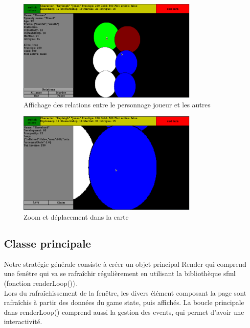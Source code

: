 \documentclass[a4paper,12pt]{article}
\begin{document}
\begin{figure}[htbp]
\includegraphics[width=0.8\textwidth]{renderRelations.png}
\caption{Affichage des relations entre le personnage joueur et les autres} 
\end{figure}

\begin{figure}[htbp]
\includegraphics[width=0.8\textwidth]{renderZoom.png}
\caption{Zoom et déplacement dans la carte} 
\end{figure}

\newpage
\subsection{Classe principale}
Notre stratégie générale consiste à créer un objet principal Render qui comprend une fenêtre qui va se rafraîchir régulièrement en utilisant la bibliothèque sfml (fonction renderLoop()).\\
Lors du rafraîchissement de la fenêtre, les divers élément composant la page sont rafraîchis à partir des données du game state, puis affichés. La boucle principale dans renderLoop() comprend aussi la gestion des events, qui permet d'avoir une interactivité. \\
\end{document}
